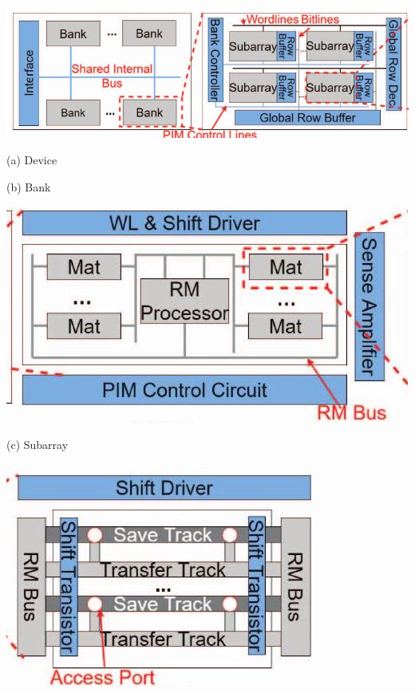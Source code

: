 \documentclass[10pt]{article}
\begin{document}
\begin{center}
\includegraphics[max width=\textwidth]{2024_05_12_abeba8a85da5b5ec4c7bg-05(4)}
\end{center}

(a) Device

(b) Bank

\begin{center}
\includegraphics[max width=\textwidth]{2024_05_12_abeba8a85da5b5ec4c7bg-05(2)}
\end{center}

(c) Subarray

\begin{center}
\includegraphics[max width=\textwidth]{2024_05_12_abeba8a85da5b5ec4c7bg-05(1)}
\end{center}
\end{document}
